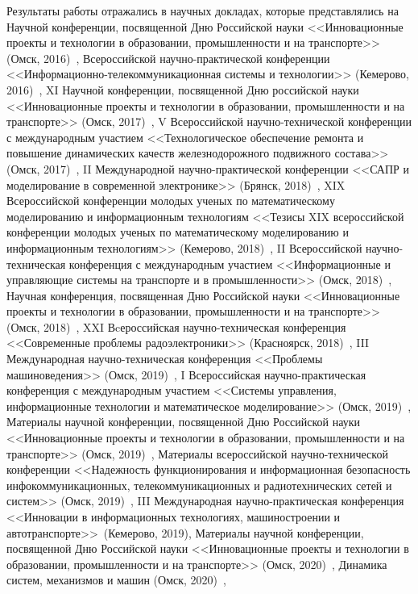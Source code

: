 
{\probation}
Результаты работы отражались в научных докладах, которые представлялись на Научной конференции, посвященной Дню Российской науки <<Инновационные проекты и технологии в образовании, промышленности и на транспорте>> (Омск, 2016)~\cite{detectors_local2016}, Всероссийской научно-практической конференции <<Информационно-телекоммуникационная системы и технологии>>
(Кемерово, 2016)~\cite{boundary_recognition2017}, XI Научной конференции, посвященной Дню российской науки <<Инновационные проекты и технологии в образовании, промышленности и на транспорте>> (Омск, 2017)~\cite{innovative_projects2017}, V Всероссийской научно-технической конференции с международным участием <<Технологическое обеспечение ремонта и повышение динамических качеств железнодорожного подвижного состава>> (Омск, 2017)~\cite{implementation_of_algorithms2017}, II Международной научно-практической конференции  <<САПР и моделирование в современной электронике>> (Брянск, 2018)~\cite{information-measuring2018}, XIX Всероссийской конференции молодых ученых по математическому моделированию и информационным технологиям <<Тезисы XIX всероссийской конференции молодых ученых  по математическому моделированию и информационным технологиям>> (Кемерово, 2018)~\cite{efficiency_mark2018}, II Всероссийской научно-техническая конференция с международным участием <<Информационные и управляющие системы на транспорте и в промышленности>> (Омск, 2018)~\cite{accuracy_study2018}, Научная конференция, посвященная Дню Российской науки <<Инновационные проекты и технологии в образовании, промышленности и на транспорте>> (Омск, 2018)~\cite{depth_expansion2018}, XXI Вcероссийская научно-техническая конференция <<Современные проблемы радоэлектроники>> (Красноярск, 2018)~\cite{application_of_fast2018}, III Международная научно-техническая конференция <<Проблемы машиноведения>> (Омск, 2019)~\cite{cache_oriented2019}, I Всероссийская научно-практическая конференция с международным участием <<Системы управления, информационные технологии и математическое моделирование>> (Омск, 2019)~\cite{comparative_analysis_2019}, Материалы научной конференции, посвященной Дню Российской науки <<Инновационные проекты и технологии в образовании, промышленности и на транспорте>> (Омск, 2019)~\cite{comparative_analysis2019}, Материалы всероссийской научно-технической конференции <<Надежность функционирования и информационная безопасность инфокоммуникационных, телекоммуникационных и радиотехнических сетей и систем>> (Омск, 2019)~\cite{modern_information2019}, III Международная научно-практическая конференция <<Инновации в информационных технологиях, машиностроении и автотранспорте>>~(Кемерово, 2019)\cite{complexity_assessment2019}, Материалы научной конференции, посвященной Дню Российской науки <<Инновационные проекты и технологии в образовании, промышленности и на транспорте>> (Омск, 2020)~\cite{comparative_study2020}, Динамика систем, механизмов и машин (Омск, 2020)~\cite{altman2020boundary},
